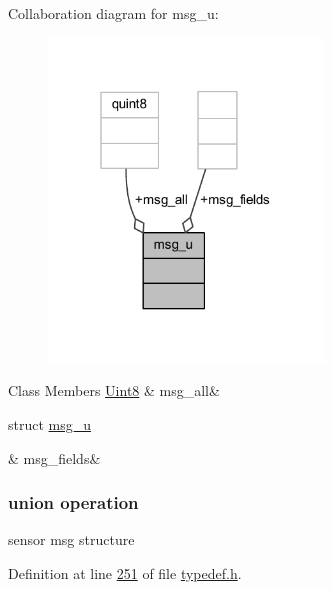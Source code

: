 Collaboration diagram for msg\+\_\+u\+:
\nopagebreak
\begin{figure}[H]
\begin{center}
\leavevmode
\includegraphics[width=208pt]{da/d2e/a00238}
\end{center}
\end{figure}
\begin{DoxyFields}{Class Members}
\hypertarget{a00001_a2763c4336b9376a5385ff279ba0a6591}{\hyperlink{a00001_a979e3e23b9a449e69ab6a8a83b6042f8}{Uint8}}\label{a00001_a2763c4336b9376a5385ff279ba0a6591}
&
msg\+\_\+all&
\\
\hline

\hypertarget{a00001_afe8839ab9699466e2c9efd2327606b8e}{struct \hyperlink{a00001_d1/d1e/a00087}{msg\+\_\+u}}\label{a00001_afe8839ab9699466e2c9efd2327606b8e}
&
msg\+\_\+fields&
\\
\hline

\end{DoxyFields}
\label{d9/dec/a00090}
\hypertarget{a00001_d9/dec/a00090}{}
\subsubsection{union operation}
sensor msg structure 

Definition at line \hyperlink{a00001_source_l00251}{251} of file \hyperlink{a00001_source}{typedef.\+h}.



